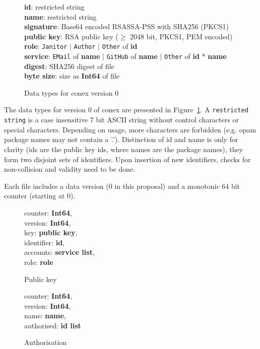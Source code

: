 \documentclass[nocopyrightspace]{sigplanconf}
\begin{document}
\begin{figure}[h]
\textbf{id}: restricted string\\
\textbf{name}: restricted string\\
\textbf{signature}: Base64 encoded RSASSA-PSS with SHA256 (PKCS1)\\
\textbf{public key}: RSA public key ($\geq$ 2048 bit, PKCS1, PEM encoded)\\
\textbf{role}: \texttt{Janitor} $|$ \texttt{Author} $|$ \texttt{Other} of \textbf{id}\\
\textbf{service}: \texttt{EMail} of \textbf{name} $|$ \texttt{GitHub} of \textbf{name} $|$ \texttt{Other} of \textbf{id} * \textbf{name}\\
\textbf{digest}: SHA256 digest of file\\
\textbf{byte size}: size as \textbf{Int64} of file
\caption{\label{fig:datatypes0}
  Data types for conex version 0}
\end{figure}

The data types for version 0 of conex are presented in Figure~\ref{fig:datatypes0}.
A \texttt{restricted string} is a case insensitive 7 bit ASCII string without control characters or special characters.
Depending on usage, more characters are forbidden (e.g. opam package names may not contain a '.').
Distinction of id and name is only for clarity (ids are the public key ids, where names are the package names), they form two disjoint sets of identifiers.
Upon insertion of new identifiers, checks for non-collision and validity need to be done.

Each file includes a data version (0 in this proposal) and a monotonic 64 bit counter (starting at 0).

\begin{figure}[h]
  \begin{minipage}{\hsize}
    \begin{minipage}{.4 \hsize}
counter: \textbf{Int64},\\
version: \textbf{Int64},\\
key: \textbf{public key},\\
identifier: \textbf{id},\\
accounts: \textbf{service list},\\
role: \textbf{role}
 \caption{\label{fig:keyformat} Public key}
    \end{minipage}
    \hspace*{.5cm}
    \begin{minipage}{.4 \hsize}
counter: \textbf{Int64},\\
version: \textbf{Int64},\\
name: \textbf{name},\\
authorised: \textbf{id list}
 \caption{\label{fig:authformat} Authorisation}
    \end{minipage}
  \end{minipage}
\end{figure}
\end{document}
